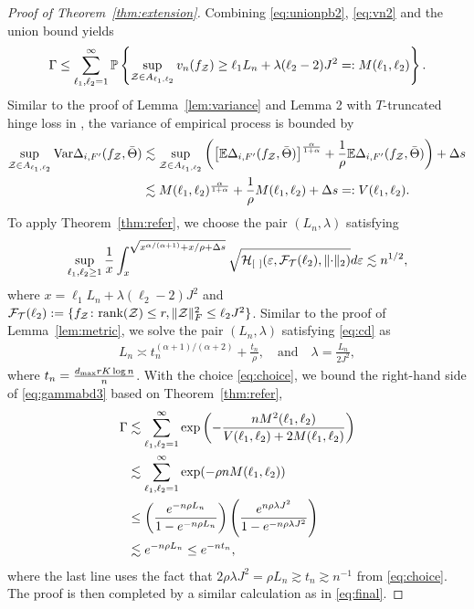 \documentclass[twoside,11pt]{article}
\theoremstyle{definition}
\begin{document}
\begin{proof}[Proof of Theorem~\ref{thm:extension}]
Combining \eqref{eq:unionpb2},  \eqref{eq:vn2} and the union bound yields
\begin{align}\label{eq:gammabd3}
\Gamma\leq \sum_{\ell_1,\ell_2=1}^\infty\mathbb{P}\left\{\sup_{\mathcal{Z}\in A_{\ell_1,\ell_2}} v_n(f_{\mathcal{Z}})\geq  \ell_1 L_n+\lambda(\ell_2-2)J^2=:M(\ell_1,\ell_2) \right\}.
\end{align}
Similar to the proof of Lemma~\ref{lem:variance} and Lemma 2 with $T$-truncated hinge loss in \cite{lee2021nonparametric}, the variance of empirical process is bounded by 
\begin{align}
\sup_{\mathcal{Z}\in A_{\ell_1,\ell_2}}\textup{Var}\Delta_{i,F'}(f_{\mathcal{Z}},\bar \Theta)& \lesssim \sup_{\mathcal{Z}\in A_{\ell_1,\ell_2}}\left( \left[\mathbb{E}\Delta_{i,F'}(f_{\mathcal{Z}},\bar \Theta)\right]^{\alpha \over 1+\alpha}+{1\over \rho}\mathbb{E}\Delta_{i,F'}(f_{\mathcal{Z}},\bar \Theta)\right)+\Delta s \\&\lesssim M(\ell_1,\ell_2)^{\alpha\over 1+\alpha}+\frac{1}{\rho}M(\ell_1,\ell_2) +\Delta s =: V(\ell_1,\ell_2).
\end{align}
To apply Theorem~\ref{thm:refer}, we choose the pair $(L_n,\lambda)$ satisfying
\begin{align}\label{eq:cd}
\sup_{\ell_1,\ell_2\geq 1}{1\over x}\int_{x}^{\sqrt{x^{\alpha/(\alpha+1)}+x/\rho+\Delta s}}\sqrt{\tH_{[\ ]}(\varepsilon, \tF_{\tT}(\ell_2),\vnormSize{}{\cdot})}d\varepsilon \lesssim n^{1/2}, 
\end{align}
where $x=\ell_1 L_n+\lambda(\ell_2-2)J^2$ and $\mathcal{F}_{\mathcal{T}}(\ell_2):= \{f_{\mathcal{Z}}\colon \text{rank}(\mathcal{Z})\leq r, \lVert\mathcal{Z}\rVert_F^2\leq \ell_2J^2\}$.
Similar to the proof of Lemma~\ref{lem:metric}, we solve the pair $(L_n,\lambda)$ satisfying \eqref{eq:cd} as
\begin{align}\label{eq:choice}
L_n\asymp t_n^{(\alpha+1)/(\alpha+2)}+\frac{t_n}{\rho},\quad\text{and}\quad\lambda =  \frac{L_n}{2J^2},
\end{align}where $ t_n={d_{\max}rK\log n \over n}$.
With the choice \eqref{eq:choice}, we bound the right-hand side of \eqref{eq:gammabd3} based on Theorem~\ref{thm:refer}, 
\begin{align}\label{eq:gammabd4}
\Gamma&\lesssim \sum_{\ell_1,\ell_2=1}^\infty \exp\left(-\frac{nM^2(\ell_1,\ell_2)}{V(\ell_1,\ell_2)+2M(\ell_1,\ell_2)}\right)\\&\lesssim \sum_{\ell_1,\ell_2=1}^\infty	\exp(-\rho  n M(\ell_1,\ell_2))\\&\leq \left(e^{-n\rho L_n}\over 1-e^{-n\rho L_n}\right)\left(e^{n\rho \lambda J^2}\over 1-e^{-n\rho \lambda J^2}\right)\\&\lesssim e^{-n\rho L_n}\leq e^{-nt_n},
\end{align}
where the last line uses the fact that $2\rho\lambda J^2= \rho L_n\gtrsim t_n\gtrsim n^{-1}$ from \eqref{eq:choice}. The proof is then completed by a similar calculation as in \eqref{eq:final}.
\end{proof}







\end{document}
